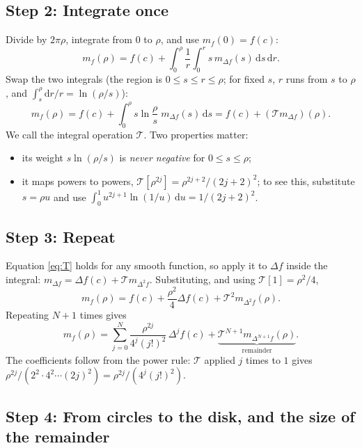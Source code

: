 \documentclass[11pt,a4paper]{article}
\theoremstyle{remark}
\newcommand{\dd}{\mathrm{d}}
\begin{document}
\subsection*{Step 2: Integrate once}

Divide by $2\pi\rho$, integrate from $0$ to $\rho$, and use $m_f(0)=f(c)$:
\[
  m_f(\rho)=f(c)+\int_0^\rho\frac{1}{r}\int_0^r s\,m_{\Delta f}(s)\,\dd s\,\dd r .
\]
Swap the two integrals (the region is $0\le s\le r\le\rho$; for fixed $s$, $r$ runs from $s$ to
$\rho$, and $\int_s^\rho\dd r/r=\ln(\rho/s)$):
\begin{equation}
  m_f(\rho)=f(c)+\int_0^\rho s\ln\frac{\rho}{s}\;m_{\Delta f}(s)\,\dd s
  =f(c)+(\mathcal T m_{\Delta f})(\rho).
  \label{eq:T}
\end{equation}
We call the integral operation $\mathcal T$. Two properties matter:
\begin{itemize}
  \item its weight $s\ln(\rho/s)$ is \emph{never negative} for $0\le s\le\rho$;
  \item it maps powers to powers, $\mathcal T[\rho^{2j}]=\rho^{2j+2}/(2j+2)^2$;
        to see this, substitute $s=\rho u$ and use
        $\int_0^1u^{2j+1}\ln(1/u)\,\dd u=1/(2j+2)^2$.
\end{itemize}

\subsection*{Step 3: Repeat}

Equation \eqref{eq:T} holds for any smooth function, so apply it to $\Delta f$ inside the integral:
$m_{\Delta f}=\Delta f(c)+\mathcal T m_{\Delta^2f}$. Substituting, and using
$\mathcal T[1]=\rho^2/4$,
\[
  m_f(\rho)=f(c)+\frac{\rho^2}{4}\Delta f(c)+\mathcal T^2m_{\Delta^2f}(\rho).
\]
Repeating $N+1$ times gives
\begin{equation}
  m_f(\rho)=\sum_{j=0}^{N}\frac{\rho^{2j}}{4^j(j!)^2}\,\Delta^jf(c)
  +\underbrace{\mathcal T^{N+1}m_{\Delta^{N+1}f}(\rho)}_{\text{remainder}} .
  \label{eq:circle}
\end{equation}
The coefficients follow from the power rule: $\mathcal T$ applied $j$ times to $1$ gives
$\rho^{2j}/(2^2\cdot4^2\cdots(2j)^2)=\rho^{2j}/(4^j(j!)^2)$.

\subsection*{Step 4: From circles to the disk, and the size of the remainder}
\end{document}
